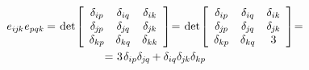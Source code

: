 \nopagebreak\vspace{-0.2em}
\begin{equation*}\begin{array}{c}
e_{i\hspace{-0.1ex}j\hspace{-0.1ex}k} \hspace{.1ex} e_{pqk} \hspace{-0.1ex} = \hspace{.2ex}
\operatorname{det} \hspace{-0.25ex} \left[
\begin{array}{ccc}
\delta_{ip} & \delta_{iq} & \delta_{ik} \\
\delta_{\hspace{-0.1ex}j\hspace{-0.1ex}p} & \delta_{\hspace{-0.1ex}j\hspace{-0.1ex}q} & \delta_{\hspace{-0.1ex}j\hspace{-0.1ex}k} \\
\delta_{kp} & \delta_{kq} & \delta_{kk}
\end{array}
\right] \hspace{-0.5ex} = \hspace{.2ex}
\operatorname{det} \hspace{-0.25ex} \left[
\begin{array}{ccc}
\delta_{ip} & \delta_{iq} & \delta_{ik} \\
\delta_{\hspace{-0.1ex}j\hspace{-0.1ex}p} & \delta_{\hspace{-0.1ex}j\hspace{-0.1ex}q} & \delta_{\hspace{-0.1ex}j\hspace{-0.1ex}k} \\
\delta_{kp} & \delta_{kq} & 3
\end{array}
\right] \hspace{-0.5ex} =
\\[1.5em]
%
= \hspace{.1ex} 3 \hspace{.2ex} \delta_{ip} \delta_{\hspace{-0.1ex}j\hspace{-0.1ex}q} \hspace{-0.1ex}
+ \delta_{iq} \delta_{\hspace{-0.1ex}j\hspace{-0.1ex}k} \delta_{kp} \hspace{-0.1ex}

\end{array}
\end{equation*}
